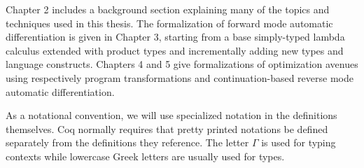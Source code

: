 Chapter 2 includes a background section explaining many of the topics and techniques used in this thesis. The formalization of forward mode automatic differentiation is given in Chapter 3, starting from a base simply-typed lambda calculus extended with product types and incrementally adding new types and language constructs. Chapters 4 and 5 give formalizations of optimization avenues using respectively program transformations and continuation-based reverse mode automatic differentiation.

As a notational convention, we will use specialized notation in the definitions themselves. Coq normally requires that pretty printed notations be defined separately from the definitions they reference. The letter $\Gamma$ is used for typing contexts while lowercase Greek letters are usually used for types.
